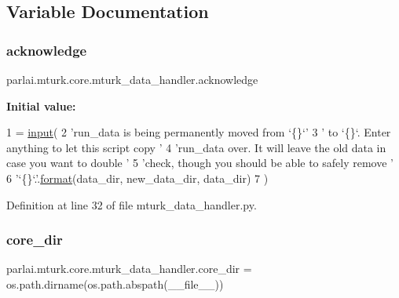 \subsection{Variable Documentation}
\mbox{\label{namespaceparlai_1_1mturk_1_1core_1_1mturk__data__handler_a2a3b9b1990945eb35021d48ba28f0dcb}} 
\subsubsection{\texorpdfstring{acknowledge}{acknowledge}}
{\footnotesize\ttfamily parlai.\+mturk.\+core.\+mturk\+\_\+data\+\_\+handler.\+acknowledge}

{\bfseries Initial value\+:}
\begin{DoxyCode}
1 =  \hyperlink{namespaceparlai_1_1mturk_1_1core_1_1dev_1_1test_1_1test__full__system_a1e1817cd65688fb90f827834d1fb4567}{input}(
2         \textcolor{stringliteral}{'run\_data is being permanently moved from `\{\}`'}
3         \textcolor{stringliteral}{' to `\{\}`. Enter anything to let this script copy '}
4         \textcolor{stringliteral}{'run\_data over. It will leave the old data in case you want to double '}
5         \textcolor{stringliteral}{'check, though you should be able to safely remove '}
6         \textcolor{stringliteral}{'`\{\}`.'}.\hyperlink{namespaceparlai_1_1messenger_1_1core_1_1shared__utils_a11f2820425bccac8d8d490ab505bcb79}{format}(data\_dir, new\_data\_dir, data\_dir)
7     )
\end{DoxyCode}


Definition at line 32 of file mturk\+\_\+data\+\_\+handler.\+py.

\mbox{\label{namespaceparlai_1_1mturk_1_1core_1_1mturk__data__handler_a8006ff4941c7804160312bc362820e97}} 
\subsubsection{\texorpdfstring{core\+\_\+dir}{core\_dir}}
{\footnotesize\ttfamily parlai.\+mturk.\+core.\+mturk\+\_\+data\+\_\+handler.\+core\+\_\+dir = os.\+path.\+dirname(os.\+path.\+abspath(\+\_\+\+\_\+file\+\_\+\+\_\+))}



